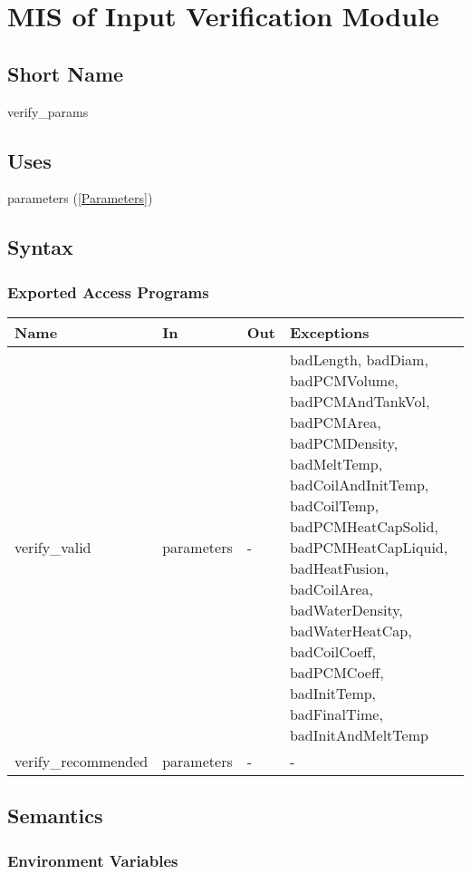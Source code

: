 \documentclass[12pt]{article}
\begin{document}
\section{MIS of Input Verification Module} \label{VerifyInput}

\subsection{Short Name}

verify\_params

\subsection{Uses}

parameters (\ref{Parameters})

\subsection{Syntax}

\subsubsection{Exported Access Programs}

\begin{center}
\begin{tabular}{p{4cm} p{2cm} p{2cm} p{6cm}}
\hline
\textbf{Name} & \textbf{In} & \textbf{Out} & \textbf{Exceptions} \\
\hline
verify\_valid & parameters & - & badLength, badDiam, badPCMVolume, badPCMAndTankVol, badPCMArea, badPCMDensity, badMeltTemp, badCoilAndInitTemp, badCoilTemp, badPCMHeatCapSolid, badPCMHeatCapLiquid, badHeatFusion, badCoilArea, badWaterDensity, badWaterHeatCap, badCoilCoeff, badPCMCoeff, badInitTemp, badFinalTime, badInitAndMeltTemp \\
\hline
verify\_recommended & parameters & - & - \\
\hline
\end{tabular}
\end{center}

\subsection{Semantics}

\subsubsection{Environment Variables}
\end{document}
